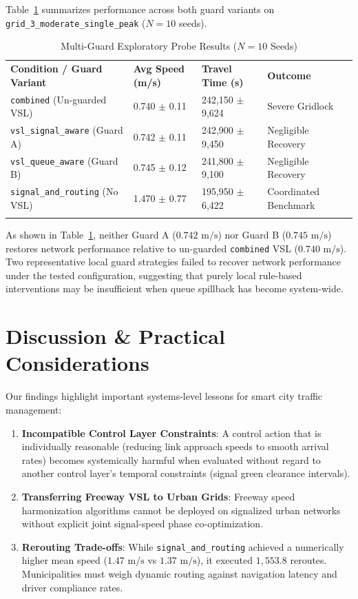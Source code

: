 \documentclass[3p,times,procedia]{elsarticle}
\begin{document}
Table~\ref{tab:exploratory_probe} summarizes performance across both guard variants on \texttt{grid\_3\_moderate\_single\_peak} ($N=10$ seeds).

\begin{table}[htbp]
\caption{Multi-Guard Exploratory Probe Results ($N=10$ Seeds)}
\label{tab:exploratory_probe}
\begin{tabular*}{\hsize}{@{\extracolsep{\fill}}llll@{}}
\toprule
\textbf{Condition / Guard Variant} & \textbf{Avg Speed (m/s)} & \textbf{Travel Time (s)} & \textbf{Outcome} \\
\colrule
\texttt{combined} (Un-guarded VSL) & 0.740 $\pm$ 0.11 & 242,150 $\pm$ 9,624 & Severe Gridlock \\
\texttt{vsl\_signal\_aware} (Guard A) & 0.742 $\pm$ 0.11 & 242,900 $\pm$ 9,450 & Negligible Recovery \\
\texttt{vsl\_queue\_aware} (Guard B) & 0.745 $\pm$ 0.12 & 241,800 $\pm$ 9,100 & Negligible Recovery \\
\texttt{signal\_and\_routing} (No VSL) & 1.470 $\pm$ 0.77 & 195,950 $\pm$ 6,422 & Coordinated Benchmark \\
\botrule
\end{tabular*}
\end{table}

As shown in Table~\ref{tab:exploratory_probe}, neither Guard A ($0.742\text{ m/s}$) nor Guard B ($0.745\text{ m/s}$) restores network performance relative to un-guarded \texttt{combined} VSL ($0.740\text{ m/s}$). Two representative local guard strategies failed to recover network performance under the tested configuration, suggesting that purely local rule-based interventions may be insufficient when queue spillback has become system-wide.


\section{Discussion \& Practical Considerations}
\label{sec:discussion}

Our findings highlight important systems-level lessons for smart city traffic management:
\begin{enumerate}
    \item \textbf{Incompatible Control Layer Constraints}: A control action that is individually reasonable (reducing link approach speeds to smooth arrival rates) becomes systemically harmful when evaluated without regard to another control layer's temporal constraints (signal green clearance intervals).
    \item \textbf{Transferring Freeway VSL to Urban Grids}: Freeway speed harmonization algorithms cannot be deployed on signalized urban networks without explicit joint signal-speed phase co-optimization.
    \item \textbf{Rerouting Trade-offs}: While \texttt{signal\_and\_routing} achieved a numerically higher mean speed ($1.47\text{ m/s}$ vs $1.37\text{ m/s}$), it executed $1,553.8$ reroutes. Municipalities must weigh dynamic routing against navigation latency and driver compliance rates.
\end{enumerate}
\end{document}
